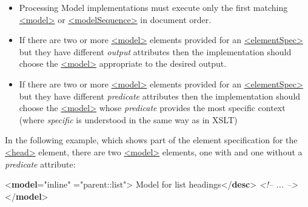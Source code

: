 \begin{itemize}
\item Processing Model implementations must execute only the first matching \hyperref[TEI.model]{<model>} or \hyperref[TEI.modelSequence]{<modelSequence>} in document order.
\item If there are two or more \hyperref[TEI.model]{<model>} elements provided for an \hyperref[TEI.elementSpec]{<elementSpec>} but they have different {\itshape output} attributes then the implementation should choose the \hyperref[TEI.model]{<model>} appropriate to the desired output.
\item If there are two or more \hyperref[TEI.model]{<model>} elements provided for an \hyperref[TEI.elementSpec]{<elementSpec>} but they have different {\itshape predicate} attributes then the implementation should choose the \hyperref[TEI.model]{<model>} whose {\itshape predicate} provides the most specific context (where \textit{specific} is understood in the same way as in XSLT) 
\end{itemize}  In the following example, which shows part of the element specification for the \hyperref[TEI.head]{<head>} element, there are two \hyperref[TEI.model]{<model>} elements, one with and one without a {\itshape predicate} attribute: \par\bgroup{}\exampleFont \begin{shaded}\noindent\mbox{}{<\textbf{model}\hspace*{1em}{behaviour}="{inline}"\mbox{}\newline 
\hspace*{1em}{predicate}="{parent::list}">}\mbox{}\newline 
{}Model for list headings{</\textbf{desc}>}\mbox{}\newline 
\textit{<!-- ... -->}\mbox{}\newline 
{</\textbf{model}>}\mbox{}\newline 

\end{shaded}

